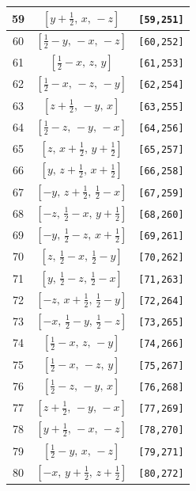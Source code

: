 \documentclass[fleqn,8pt]{jsarticle}
\begin{document}
\begin{longtable}{ccc}
59 & $\left[ y + \frac{1}{2},\, x,\, - z \right]$ & {\tt [59,251]} \\ \hline
60 & $\left[ \frac{1}{2} - y,\, - x,\, - z \right]$ & {\tt [60,252]} \\ \hline
61 & $\left[ \frac{1}{2} - x,\, z,\, y \right]$ & {\tt [61,253]} \\ \hline
62 & $\left[ \frac{1}{2} - x,\, - z,\, - y \right]$ & {\tt [62,254]} \\ \hline
63 & $\left[ z + \frac{1}{2},\, - y,\, x \right]$ & {\tt [63,255]} \\ \hline
64 & $\left[ \frac{1}{2} - z,\, - y,\, - x \right]$ & {\tt [64,256]} \\ \hline
65 & $\left[ z,\, x + \frac{1}{2},\, y + \frac{1}{2} \right]$ & {\tt [65,257]} \\ \hline
66 & $\left[ y,\, z + \frac{1}{2},\, x + \frac{1}{2} \right]$ & {\tt [66,258]} \\ \hline
67 & $\left[ - y,\, z + \frac{1}{2},\, \frac{1}{2} - x \right]$ & {\tt [67,259]} \\ \hline
68 & $\left[ - z,\, \frac{1}{2} - x,\, y + \frac{1}{2} \right]$ & {\tt [68,260]} \\ \hline
69 & $\left[ - y,\, \frac{1}{2} - z,\, x + \frac{1}{2} \right]$ & {\tt [69,261]} \\ \hline
70 & $\left[ z,\, \frac{1}{2} - x,\, \frac{1}{2} - y \right]$ & {\tt [70,262]} \\ \hline
71 & $\left[ y,\, \frac{1}{2} - z,\, \frac{1}{2} - x \right]$ & {\tt [71,263]} \\ \hline
72 & $\left[ - z,\, x + \frac{1}{2},\, \frac{1}{2} - y \right]$ & {\tt [72,264]} \\ \hline
73 & $\left[ - x,\, \frac{1}{2} - y,\, \frac{1}{2} - z \right]$ & {\tt [73,265]} \\ \hline
74 & $\left[ \frac{1}{2} - x,\, z,\, - y \right]$ & {\tt [74,266]} \\ \hline
75 & $\left[ \frac{1}{2} - x,\, - z,\, y \right]$ & {\tt [75,267]} \\ \hline
76 & $\left[ \frac{1}{2} - z,\, - y,\, x \right]$ & {\tt [76,268]} \\ \hline
77 & $\left[ z + \frac{1}{2},\, - y,\, - x \right]$ & {\tt [77,269]} \\ \hline
78 & $\left[ y + \frac{1}{2},\, - x,\, - z \right]$ & {\tt [78,270]} \\ \hline
79 & $\left[ \frac{1}{2} - y,\, x,\, - z \right]$ & {\tt [79,271]} \\ \hline
80 & $\left[ - x,\, y + \frac{1}{2},\, z + \frac{1}{2} \right]$ & {\tt [80,272]} \\ \hline

\end{longtable}
\end{document}
